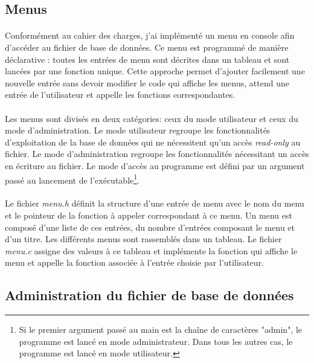\documentclass{article}
\begin{document}
    \subsection{Menus}
    \paragraph{}
    Conformément au cahier des charges, j'ai implémenté un menu en console afin d'accéder au fichier de base de données. Ce menu est programmé de manière déclarative : toutes les entrées de menu sont décrites dans un tableau et sont lancées par une fonction unique. Cette approche permet d'ajouter facilement une nouvelle entrée sans devoir modifier le code qui affiche les menus, attend une entrée de l'utilisateur et appelle les fonctions correspondantes.

    \paragraph{}
    Les menus sont divisés en deux catégories: ceux du mode utilisateur et ceux du mode d'administration. Le mode utilisateur regroupe les fonctionnalités d'exploitation de la base de données qui ne nécessitent qu'un accès \emph{read-only} au fichier. Le mode d'administration regroupe les fonctionnalités nécessitant un accès en écriture au fichier. Le mode d'accès au programme est défini par un argument passé au lancement de l'exécutable\footnote{Si le premier argument passé au main est la chaîne de caractères "admin", le programme est lancé en mode administrateur. Dans tous les autres cas, le programme est lancé en mode utilisateur.}.

    \paragraph{}
    Le fichier \emph{menu.h} définit la structure d'une entrée de menu avec le nom du menu et le pointeur de la fonction à appeler correspondant à ce menu. Un menu est composé d'une liste de ces entrées, du nombre d'entrées composant le menu et d'un titre. Les différents menus sont rassemblés dans un tableau. Le fichier \emph{menu.c} assigne des valeurs à ce tableau et implémente la fonction qui affiche le menu et appelle la fonction associée à l'entrée choisie par l'utilisateur.


    \subsection{Administration du fichier de base de données}
\end{document}
